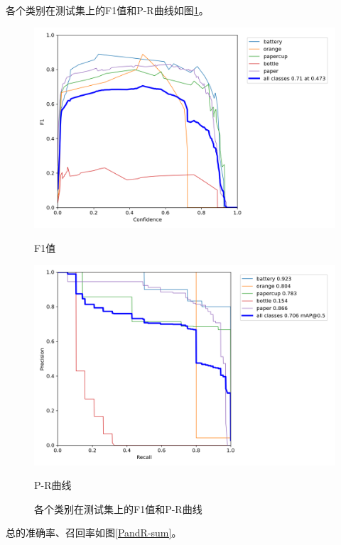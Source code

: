 \documentclass{article}
\begin{document}
各个类别在测试集上的F1值和P-R曲线如图\ref{f1andPR}。

\begin{figure}[H]
    \begin{minipage}[H]{0.5\linewidth}
        \centering
        \includegraphics[width=\textwidth]{figures/F1_curve.png}
        \caption{F1值}
    \end{minipage}
    \begin{minipage}[H]{0.5\linewidth}
        \centering
        \includegraphics[width=\textwidth]{figures/PR_curve.png}
        \caption{P-R曲线}
    \end{minipage}
    \label{f1andPR}
    \caption{各个类别在测试集上的F1值和P-R曲线}
\end{figure}

总的准确率、召回率如图\ref{PandR-sum}。
\end{document}
